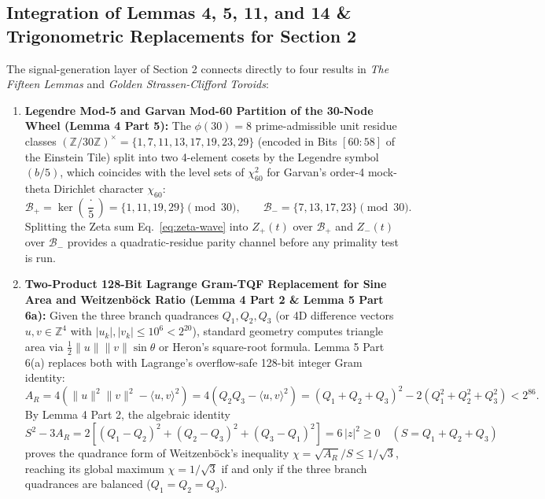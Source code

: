 \documentclass[11pt, a4paper]{article}
\begin{document}
\subsection{Integration of Lemmas 4, 5, 11, and 14 \& Trigonometric Replacements for Section 2}
The signal-generation layer of Section 2 connects directly to four results in \textit{The Fifteen Lemmas} and \textit{Golden Strassen-Clifford Toroids}:
\begin{enumerate}
    \item \textbf{Legendre Mod-5 and Garvan Mod-60 Partition of the 30-Node Wheel (Lemma 4 Part 5):}
    The $\phi(30) = 8$ prime-admissible unit residue classes $(\mathbb{Z}/30\mathbb{Z})^\times = \{1, 7, 11, 13, 17, 19, 23, 29\}$ (encoded in Bits $[60:58]$ of the Einstein Tile) split into two 4-element cosets by the Legendre symbol $(b/5)$, which coincides with the level sets of $\chi_{60}^2$ for Garvan's order-4 mock-theta Dirichlet character $\chi_{60}$:
    \begin{equation}
    \mathcal{B}_+ = \ker\!\left(\frac{\cdot}{5}\right) = \{1, 11, 19, 29\} \pmod{30}, \qquad \mathcal{B}_- = \{7, 13, 17, 23\} \pmod{30}.
    \end{equation}
    Splitting the Zeta sum Eq.~\eqref{eq:zeta-wave} into $Z_+(t)$ over $\mathcal{B}_+$ and $Z_-(t)$ over $\mathcal{B}_-$ provides a quadratic-residue parity channel before any primality test is run.
    \item \textbf{Two-Product 128-Bit Lagrange Gram-TQF Replacement for Sine Area and Weitzenb\"ock Ratio (Lemma 4 Part 2 \& Lemma 5 Part 6a):}
    Given the three branch quadrances $Q_1, Q_2, Q_3$ (or 4D difference vectors $u, v \in \mathbb{Z}^4$ with $|u_k|, |v_k| \le 10^6 < 2^{20}$), standard geometry computes triangle area via $\frac{1}{2}\|u\|\|v\|\sin\theta$ or Heron's square-root formula. Lemma 5 Part 6(a) replaces both with Lagrange's overflow-safe 128-bit integer Gram identity:
    \begin{equation}
    A_R = 4\left(\|u\|^2\|v\|^2 - \langle u,v\rangle^2\right) = 4\left(Q_2 Q_3 - \langle u,v\rangle^2\right) = \left(Q_1 + Q_2 + Q_3\right)^2 - 2\left(Q_1^2 + Q_2^2 + Q_3^2\right) < 2^{86}.
    \end{equation}
    By Lemma 4 Part 2, the algebraic identity
    \begin{equation}
    S^2 - 3A_R = 2\left[(Q_1 - Q_2)^2 + (Q_2 - Q_3)^2 + (Q_3 - Q_1)^2\right] = 6\,|z|^2 \ge 0 \quad (S = Q_1 + Q_2 + Q_3)
    \end{equation}
    proves the quadrance form of Weitzenb\"ock's inequality $\chi = \sqrt{A_R}/S \le 1/\sqrt{3}$, reaching its global maximum $\chi = 1/\sqrt{3}$ if and only if the three branch quadrances are balanced ($Q_1 = Q_2 = Q_3$).

\end{enumerate}
\end{document}
